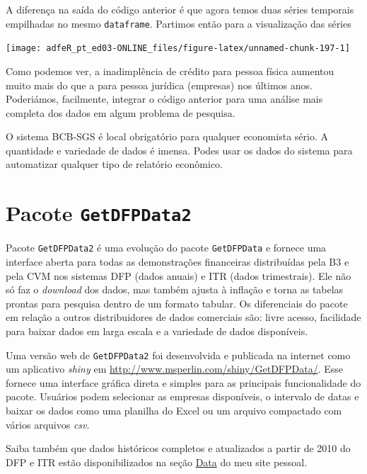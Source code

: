 \documentclass[
  11pt,
]{book}
\newenvironment{rmdimportant}
{\begin{importantblock}

	} {\end{importantblock}}
\begin{document}
A diferença na saída do código anterior é que agora temos duas séries temporais empilhadas no mesmo \texttt{dataframe}. Partimos então para a visualização das séries

\begin{center}\texttt{[image: adfeR\_pt\_ed03-ONLINE\_files/figure-latex/unnamed-chunk-197-1]} \end{center}

Como podemos ver, a inadimplência de crédito para pessoa física aumentou muito mais do que a para pessoa jurídica (empresas) nos últimos anos. Poderiámos, facilmente, integrar o código anterior para uma análise mais completa dos dados em algum problema de pesquisa.

\begin{rmdimportant}
O sistema BCB-SGS é local obrigatório para qualquer economista sério. A
quantidade e variedade de dados é imensa. Podes usar os dados do sistema
para automatizar qualquer tipo de relatório econômico.
\end{rmdimportant}

\hypertarget{pacote-getdfpdata2}{%
\section{\texorpdfstring{Pacote \texttt{GetDFPData2}}{Pacote GetDFPData2}}\label{pacote-getdfpdata2}}

Pacote \texttt{GetDFPData2} \citep{R-GetDFPData2} é uma evolução do pacote \texttt{GetDFPData} \citep{R-GetDFPData} e fornece uma interface aberta para todas as demonstrações financeiras distribuídas pela B3 e pela CVM nos sistemas DFP (dados anuais) e ITR (dados trimestrais). Ele não só faz o \emph{download} dos dados, mas também ajusta à inflação e torna as tabelas prontas para pesquisa dentro de um formato tabular. Os diferenciais do pacote em relação a outros distribuidores de dados comerciais são: livre acesso, facilidade para baixar dados em larga escala e a variedade de dados disponíveis.

\begin{rmdimportant}
Uma versão web de \texttt{GetDFPData2} foi desenvolvida e publicada na
internet como um aplicativo \emph{shiny} em
\url{http://www.msperlin.com/shiny/GetDFPData/}. Esse fornece uma
interface gráfica direta e simples para as principais funcionalidade do
pacote. Usuários podem selecionar as empresas disponíveis, o intervalo
de datas e baixar os dados como uma planilha do Excel ou um arquivo
compactado com vários arquivos \emph{csv}.

Saiba também que dados históricos completos e atualizados a partir de
2010 do DFP e ITR estão disponibilizados na seção
\href{https://www.msperlin.com/data/}{Data} do meu site pessoal.
\end{rmdimportant}
\end{document}
